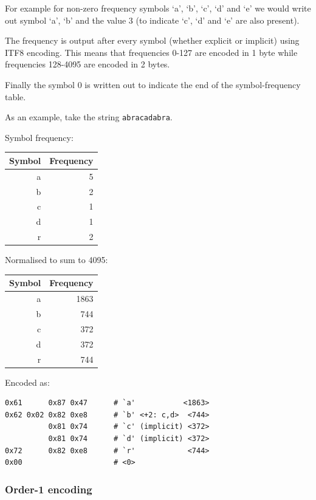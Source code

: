 \documentclass[a4paper]{article}
\begin{document}
For example for non-zero frequency symbols `a', `b', `c', `d' and `e'
we would write out symbol `a', `b' and the value 3 (to indicate `c',
`d' and `e' are also present).

The frequency is output after every symbol (whether explicit or
implicit) using ITF8 encoding. This means that frequencies 0-127 are
encoded in 1 byte while frequencies 128-4095 are encoded in 2 bytes.

Finally the symbol 0 is written out to indicate the end of the
symbol-frequency table.

As an example, take the string \texttt{abracadabra}.

\begin{minipage}[t]{0.5\textwidth}
Symbol frequency:
\\[8pt]
\begin{tabular}{ |r|r| }
\hline
Symbol & Frequency\\
\hline
a & 5 \\
b & 2 \\
c & 1 \\
d & 1 \\
r & 2 \\
\hline
\end{tabular}
\end{minipage}
\begin{minipage}[t]{0.5\textwidth}
Normalised to sum to 4095:
\\[8pt]
\begin{tabular}{ |r|r|}
\hline
Symbol & Frequency\\
\hline
a & 1863 \\
b &  744 \\
c &  372 \\
d &  372 \\
r &  744 \\
\hline
\end{tabular}
\end{minipage}

Encoded as:
\begin{verbatim}
0x61      0x87 0x47      # `a'           <1863>
0x62 0x02 0x82 0xe8      # `b' <+2: c,d>  <744>
          0x81 0x74      # `c' (implicit) <372>
          0x81 0x74      # `d' (implicit) <372>
0x72      0x82 0xe8      # `r'            <744>
0x00                     # <0>
\end{verbatim}


\subsubsection*{Order-1 encoding}
\end{document}
